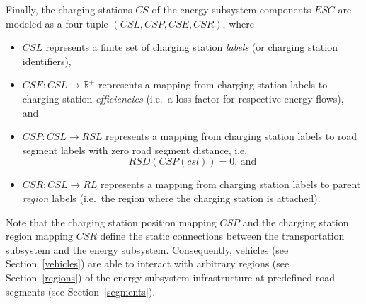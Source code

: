 Finally, the charging stations $CS$ of the energy subsystem components $ESC$ are modeled as a four-tuple $(CSL, CSP, CSE, CSR)$, where
\begin{itemize}
	\item $CSL$ represents a finite set of charging station \textit{labels} (or charging station identifiers),
	\item $CSE: CSL \rightarrow \mathbb{R}^+$ represents a mapping from charging station labels to charging station \textit{efficiencies} (i.e.\ a loss factor for respective energy flows), and
	\item $CSP: CSL \rightarrow RSL$ represents a mapping from charging station labels to road segment labels with zero road segment distance, i.e.\
	\[
		RSD(CSP(csl)) = 0 \textrm{, and}
	\]
	\item $CSR: CSL \rightarrow RL$ represents a mapping from charging station labels to parent \textit{region} labels (i.e.\ the region where the charging station is attached).
\end{itemize}
Note that the charging station position mapping $CSP$  and the charging station region mapping $CSR$ define the static connections between the transportation subsystem and the energy subsystem. Consequently, vehicles (see Section~\ref{vehicles}) are able to interact with arbitrary regions (see Section~\ref{regions}) of the energy subsystem infrastructure at predefined road segments (see Section~\ref{segments}).
